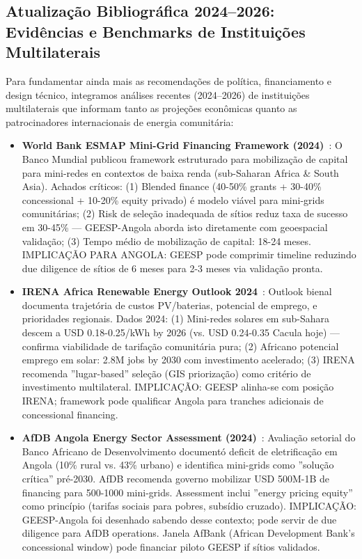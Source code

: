 \documentclass[12pt, a4paper]{article}
\begin{document}
\subsection{Atualização Bibliográfica 2024--2026: Evidências e Benchmarks de Instituições Multilaterais}

Para fundamentar ainda mais as recomendações de política, financiamento e design técnico, integramos análises recentes (2024--2026) de instituições multilaterais que informam tanto as projeções econômicas quanto as patrocinadores internacionais de energia comunitária:

\begin{itemize}

  \item \textbf{World Bank ESMAP Mini-Grid Financing Framework (2024)}~\citep{WorldBank2024}: O Banco Mundial publicou framework estruturado para mobilização de capital para mini-redes en contextos de baixa renda (sub-Saharan Africa \& South Asia). Achados críticos: (1) Blended finance (40-50\% grants + 30-40\% concessional + 10-20\% equity privado) é modelo viável para mini-grids comunitárias; (2) Risk de seleção inadequada de sítios reduz taxa de sucesso em 30-45\% — GEESP-Angola aborda isto diretamente com geoespacial validação; (3) Tempo médio de mobilização de capital: 18-24 meses. IMPLICAÇÃO PARA ANGOLA: GEESP pode comprimir timeline reduzindo due diligence de sítios de 6 meses para 2-3 meses via validação pronta.
  
  \item \textbf{IRENA Africa Renewable Energy Outlook 2024}~\citep{IRENA2024}: Outlook bienal documenta trajetória de custos PV/baterias, potencial de emprego, e prioridades regionais. Dados 2024: (1) Mini-redes solares em sub-Sahara descem a USD 0.18-0.25/kWh by 2026 (vs. USD 0.24-0.35 Cacula hoje) — confirma viabilidade de tarifação comunitária pura; (2) Africano potencial emprego em solar: 2.8M jobs by 2030 com investimento acelerado; (3) IRENA recomenda ''lugar-based'' seleção (GIS priorização) como critério de investimento multilateral. IMPLICAÇÃO: GEESP alinha-se com posição IRENA; framework pode qualificar Angola para tranches adicionais de concessional financing.
  
  \item \textbf{AfDB Angola Energy Sector Assessment (2024)}~\citep{AfDB2024}: Avaliação setorial do Banco Africano de Desenvolvimento documentó deficit de eletrificação em Angola (10\% rural vs. 43\% urbano) e identifica mini-grids como ''solução crítica'' pré-2030. AfDB recomenda governo mobilizar USD 500M-1B de financing para 500-1000 mini-grids. Assessment inclui ''energy pricing equity'' como princípio (tarifas sociais para pobres, subsídio cruzado). IMPLICAÇÃO: GEESP-Angola foi desenhado sabendo desse contexto; pode servir de due diligence para AfDB operations. Janela AfBank (African Development Bank's concessional window) pode financiar piloto GEESP if sítios validados.
  

\end{itemize}
\end{document}
